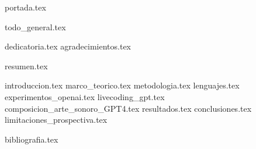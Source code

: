 


  {portada.tex}
  \setcounter{page}{2} %

  \pagecolor{yellow!30}
  \todototoc
  \clearpage
  \nopagecolor

  {todo_general.tex}
  \clearpage

  \thispagestyle{empty} 
  {dedicatoria.tex}
  \clearpage
  \thispagestyle{empty} 
  {agradecimientos.tex}
  \thispagestyle{empty} 
  \clearpage
  \thispagestyle{empty} %
  
  \pagestyle{fancy} 

  {resumen.tex}
  \clearpage
  

  \tableofcontents
  \clearpage

  \listoffigures 
  \clearpage

  \listoftables
  \clearpage

  \label{chap:glosario}
  \printglossary[title=Índice de acrónimos, toctitle=Índice de acrónimos]
  \clearpage

  \setcounter{inicioContenido}{\value{page}}

  {introduccion.tex}
  {marco_teorico.tex}
  {metodologia.tex}
  {lenguajes.tex}
  {experimentos_openai.tex}
  {livecoding_gpt.tex}
  {composicion_arte_sonoro_GPT4.tex}
  {resultados.tex}
  {conclusiones.tex}
  {limitaciones_prospectiva.tex}

  \setcounter{finContenido}{\value{page}}

  {bibliografia.tex}
  \setcounter{antesAnexos}{\value{page}}
  \clearpage


